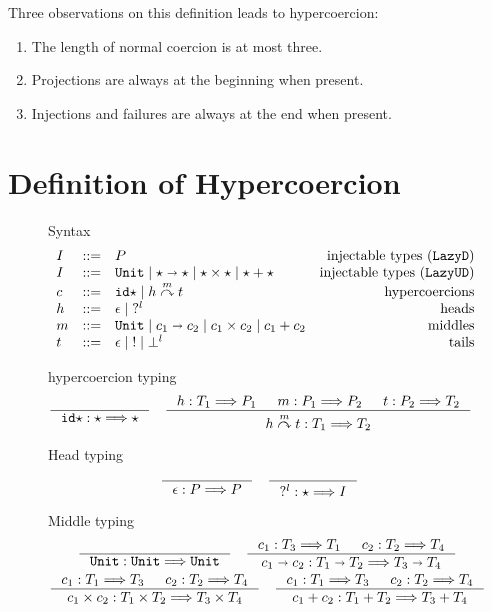 \documentclass[acmsmall,review,anonymous]{acmart}\settopmatter{printfolios=true,printccs=false,printacmref=false}
\newcommand{\stxrule}[3]{#1 & ::= & #3 & \text{#2}\\}
\newcommand{\plus}[0]{+}
\newcommand{\lazyUD}{$\mathtt{Lazy UD}$}
\newcommand{\lazyD}{$\mathtt{Lazy D}$}
\newcommand{\TOOdyn}[0]{\star}
\newcommand{\POOunit}[0]{\mathtt{Unit}}
\newcommand{\POOfun}[2]{#1 \shortrightarrow #2}
\newcommand{\POOprod}[2]{#1 \times #2}
\newcommand{\POOsum}[2]{#1 \plus #2}
\newcommand{\typingHC}[3]{#1 : #2 \Longrightarrow #3}
\newcommand{\hyperCoercionI}[0]{\mathtt{id\star}}
\newcommand{\hyperCoercionC}[3]{#1 \overset{#2}{\curvearrowright} #3}
\begin{document}
Three observations on this definition leads to hypercoercion: 
\begin{enumerate}
	\item The length of normal coercion is at most three.
	\item Projections are always at the beginning when present.
	\item Injections and failures are always at the end when present.
\end{enumerate}


\section{Definition of Hypercoercion} \label{sec:hypercoercion-definition}

\begin{figure}
	Syntax
	\[
	\begin{array}{lclr}
	\stxrule{I}{injectable types (\lazyD)}{P}
	\stxrule{I}{injectable types (\lazyUD)}{
		\POOunit \mid
		\POOfun{\TOOdyn}{\TOOdyn} \mid
		\POOprod{\TOOdyn}{\TOOdyn} \mid
		\POOsum{\TOOdyn}{\TOOdyn}
	}
	\stxrule{c}{hypercoercions}{
		\hyperCoercionI \mid{}
		\hyperCoercionC{h}{m}{t}
	}
	\stxrule{h}{heads}{
		\epsilon \mid{}
		?^l
	}
	\stxrule{m}{middles}{
		\POOunit \mid
		\POOfun{c_1}{c_2} \mid
		\POOprod{c_1}{c_2} \mid
		\POOsum{c_1}{c_2}
	}
	\stxrule{t}{tails}{
		\epsilon \mid{}
		! \mid{}
		\bot^l
	}
	\end{array}
	\]
		
	hypercoercion typing 
	\begin{gather*}
	\inference{}{\typingHC{\hyperCoercionI}{\TOOdyn}{\TOOdyn}}
	\quad
	\inference{
		\typingHC{h}{T_1}{P_1} &
		\typingHC{m}{P_1}{P_2} &
		\typingHC{t}{P_2}{T_2}
	}{
		\typingHC{\hyperCoercionC{h}{m}{t}}{T_1}{T_2}
	}
	\end{gather*}
	
	Head typing \fbox{$ \typingHC{h}{T}{P} $}
	\begin{gather*}
	\inference{}{\typingHC{\epsilon}{P}{P}}
	\quad
	\inference{}{\typingHC{?^l}{\TOOdyn}{I}}
	\end{gather*}
	
	Middle typing \fbox{$ \typingHC{m}{T}{T} $}
	\begin{gather*}
	\inference{}{\typingHC{\POOunit}{\POOunit}{\POOunit}}
	\quad
	\inference{
		\typingHC{c_1}{T_3}{T_1} &
		\typingHC{c_2}{T_2}{T_4}
	}{
		\typingHC{\POOfun{c_1}{c_2}}{\POOfun{T_1}{T_2}}{\POOfun{T_3}{T_4}}
	}
	\\
	\inference{
		\typingHC{c_1}{T_1}{T_3} &
		\typingHC{c_2}{T_2}{T_4}
	}{
		\typingHC{\POOprod{c_1}{c_2}}{\POOprod{T_1}{T_2}}{\POOprod{T_3}{T_4}}
	}
	\quad
	\inference{
		\typingHC{c_1}{T_1}{T_3} &
		\typingHC{c_2}{T_2}{T_4}
	}{
		\typingHC{\POOsum{c_1}{c_2}}{\POOsum{T_1}{T_2}}{\POOsum{T_3}{T_4}}
	}
		\end{gather*}
		

\end{figure}
\end{document}
